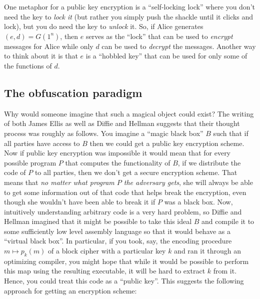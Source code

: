 One metaphor for a public key encryption is a ``self-locking lock''
where you don't need the key to \emph{lock it} (but rather you simply
push the shackle until it clicks and lock), but you do need the key to
\emph{unlock} it. So, if Alice generates \((e,d)=G(1^n)\), then \(e\)
serves as the ``lock'' that can be used to \emph{encrypt} messages for
Alice while only \(d\) can be used to \emph{decrypt} the messages.
Another way to think about it is that \(e\) is a ``hobbled key'' that
can be used for only some of the functions of \(d\).

\subsection{The obfuscation paradigm}\label{10-The-obfuscation-paradi}

Why would someone imagine that such a magical object could exist? The
writing of both James Ellis as well as Diffie and Hellman suggests that
their thought process was roughly as follows. You imagine a ``magic
black box'' \(B\) such that if all parties have access to \(B\) then we
could get a public key encryption scheme. Now if public key encryption
was impossible it would mean that for every possible program \(P\) that
computes the functionality of \(B\), if we distribute the code of \(P\)
to all parties, then we don't get a secure encryption scheme. That means
that \emph{no matter what program \(P\) the adversary gets}, she will
always be able to get some information out of that code that helps break
the encryption, even though she wouldn't have been able to break it if
\(P\) was a black box. Now, intuitively understanding arbitrary code is
a very hard problem, so Diffie and Hellman imagined that it might be
possible to take this ideal \(B\) and compile it to some sufficiently
low level assembly language so that it would behave as a ``virtual black
box''. In particular, if you took, say, the encoding procedure
\(m \mapsto p_k(m)\) of a block cipher with a particular key \(k\) and
ran it through an optimizing compiler, you might hope that while it
would be possible to perform this map using the resulting executable, it
will be hard to extract \(k\) from it. Hence, you could treat this code
as a ``public key''. This suggests the following approach for getting an
encryption scheme:

